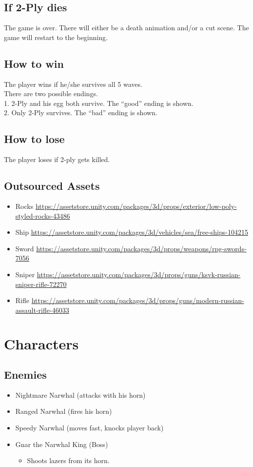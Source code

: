 \documentclass{article}
\begin{document}
\subsection{If 2-Ply dies}
The game is over. There will either be a death animation and/or a cut scene. The game will restart to the beginning.
\subsection{How to win}
The player wins if he/she survives all 5 waves.\\
There are two possible endings.\\
1. 2-Ply and his egg both survive. The ``good'' ending is shown.\\
2. Only 2-Ply survives. The ``bad'' ending is shown.
\subsection{How to lose}
The player loses if 2-ply gets killed.

\subsection{Outsourced Assets}
\begin{itemize}
\item Rocks \url{https://assetstore.unity.com/packages/3d/props/exterior/low-poly-styled-rocks-43486}
\item Ship \url{https://assetstore.unity.com/packages/3d/vehicles/sea/free-ships-104215}
\item Sword
\url{https://assetstore.unity.com/packages/3d/props/weapons/rpg-swords-7056}
\item Sniper
\url{https://assetstore.unity.com/packages/3d/props/guns/ksvk-russian-sniper-rifle-72270}
\item Rifle
\url{https://assetstore.unity.com/packages/3d/props/guns/modern-russian-assault-rifle-46033}
\end{itemize}

\section{Characters}
\subsection{Enemies}
\begin{itemize}
\item Nightmare Narwhal (attacks with his horn)
\item Ranged Narwhal (fires his horn)
\item Speedy Narwhal (moves fast, knocks player back)
\item Gnar the Narwhal King (Boss)
\begin{itemize}
\item Shoots lazers from its horn.
\end{itemize}
\end{itemize}
\end{document}
